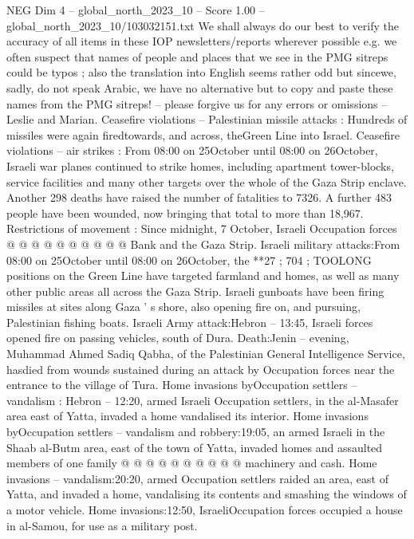 \begin{textsample}{NEG Dim 4 – global\_north\_2023\_10 – Score 1.00 – global\_north\_2023\_10/103032151.txt}  \label{ex:f4_neg_017}
We shall always do our best to verify the accuracy of all items in these IOP newsletters/reports wherever possible e.g. we often suspect that names of people and places that we see in the PMG sitreps could be typos ; also the translation into English seems rather odd but sincewe, sadly, do not speak Arabic, we have no alternative but to copy and paste these names from the PMG sitreps! -- please forgive us for any errors or omissions -- Leslie and Marian.
Ceasefire violations -- Palestinian missile attacks : Hundreds of missiles were again firedtowards, and across, theGreen Line into Israel.
Ceasefire violations -- air strikes : From 08:00 on 25October until 08:00 on 26October, Israeli war planes continued to strike homes, including apartment tower-blocks, service facilities and many other targets over the whole of the Gaza Strip enclave.
Another 298 deaths have raised the number of fatalities to 7326.
A further 483 people have been wounded, now bringing that total to more than 18,967.
Restrictions of movement : Since midnight, 7 October, Israeli Occupation forces @ @ @ @ @ @ @ @ @ @ Bank and the Gaza Strip.
Israeli military attacks:From 08:00 on 25October until 08:00 on 26October, the **27 ; 704 ; TOOLONG positions on the Green Line have targeted farmland and homes, as well as many other public areas all across the Gaza Strip.
Israeli gunboats have been firing missiles at sites along Gaza ' s shore, also opening fire on, and pursuing, Palestinian fishing boats.
Israeli Army attack:Hebron -- 13:45, Israeli forces opened fire on passing vehicles, south of Dura.
Death:Jenin -- evening, Muhammad Ahmed Sadiq Qabha, of the Palestinian General Intelligence Service, hasdied from wounds sustained during an attack by Occupation forces near the entrance to the village of Tura.
Home invasions byOccupation settlers -- vandalism : Hebron -- 12:20, armed Israeli Occupation settlers, in the al-Masafer area east of Yatta, invaded a home vandalised its interior.
Home invasions byOccupation settlers -- vandalism and robbery:19:05, an armed Israeli in the Shaab al-Butm area, east of the town of Yatta, invaded homes and assaulted members of one family @ @ @ @ @ @ @ @ @ @ machinery and cash.
Home invasions -- vandalism:20:20, armed Occupation settlers raided an area, east of Yatta, and invaded a home, vandalising its contents and smashing the windows of a motor vehicle.
Home invasions:12:50, IsraeliOccupation forces occupied a house in al-Samou, for use as a military post.

\end{textsample}

